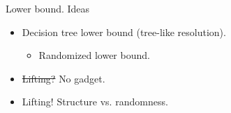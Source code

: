 \begin{frame}{Lower bound. Ideas}

    \begin{itemize}
        \item Decision tree lower bound (tree-like resolution).
            \pause
            \begin{itemize}
                \item \alert{Randomized} lower bound.
            \end{itemize}
            \pause
        \item {} \pause \sout{Lifting?} \alert{No gadget.}
            \pause
        \item Lifting! Structure vs. randomness.
    \end{itemize}
\end{frame}

